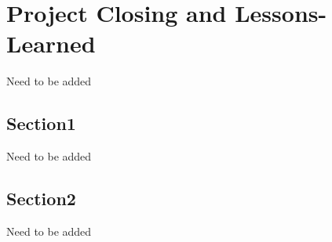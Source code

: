 \chapter{Project Closing and Lessons-Learned}
Need to be added
\section{Section1}
Need to be added
\section{Section2}
Need to be added

\FloatBarrier
\newpage
